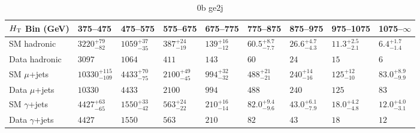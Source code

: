 \documentclass[8pt]{article}
\def\scalht{\mbox{$H_{\rm{T}}$}\xspace}
\newcommand\T{\rule{0pt}{2.6ex}}
\newcommand\B{\rule[-1.2ex]{0pt}{0pt}}
\begin{document}
\begin{table}[ht!]
\caption{0b ge2j}
\label{tab:ensemble-0b ge2j}
\centering
\begin{tabular}{ lllllllll }

\hline
\scalht Bin (GeV)       & 375--475                       & 475--575                       & 575--675                       & 675--775                       & 775--875                       & 875--975                       & 975--1075                      & 1075--$\infty$                 \\ [1.000000ex]
\hline
SM hadronic\T           & $3220^{+79}_{-82}$             & $1059^{+37}_{-35}$             & $387^{+24}_{-19}$              & $139^{+16}_{-12}$              & $60.5^{+8.7}_{-7.7}$           & $26.6^{+4.7}_{-4.3}$           & $11.3^{+2.5}_{-2.1}$           & $6.4^{+1.7}_{-1.4}$            \\ 
Data hadronic\B         & $3097$                         & $1064$                         & $411$                          & $143$                          & $60$                           & $24$                           & $15$                           & $6$                            \\ 
\hline
SM $\mu$+jets\T         & $10330^{+115}_{-109}$          & $4433^{+70}_{-75}$             & $2100^{+49}_{-45}$             & $994^{+32}_{-32}$              & $488^{+21}_{-21}$              & $240^{+14}_{-16}$              & $125^{+12}_{-10}$              & $83.0^{+8.9}_{-9.9}$           \\ 
Data $\mu$+jets\B       & $10330$                        & $4433$                         & $2100$                         & $994$                          & $488$                          & $240$                          & $125$                          & $83$                           \\ 
\hline
SM $\gamma$+jets\T      & $4427^{+63}_{-65}$             & $1550^{+33}_{-42}$             & $563^{+24}_{-22}$              & $210^{+16}_{-14}$              & $82.0^{+9.4}_{-9.6}$           & $43.0^{+6.1}_{-7.9}$           & $18.0^{+4.2}_{-4.8}$           & $12.0^{+4.0}_{-3.1}$           \\ 
Data $\gamma$+jets\B    & $4427$                         & $1550$                         & $563$                          & $210$                          & $82$                           & $43$                           & $18$                           & $12$                           \\ 
\hline

\end{tabular}
\end{table}
\end{document}
